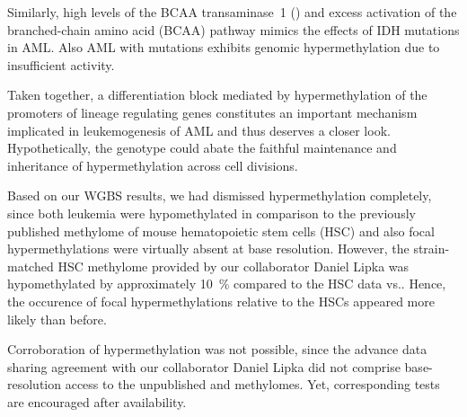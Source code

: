Similarly, high levels of the BCAA transaminase~1 () and excess activation of the branched-chain amino acid (BCAA) pathway mimics the effects of IDH mutations in AML\cite{Raffel2017}. Also AML with  mutations exhibits genomic hypermethylation due to insufficient  activity\cite{Rampal2014}.

Taken together, a differentiation block mediated by hypermethylation of the promoters of lineage regulating genes constitutes an important mechanism implicated in leukemogenesis of AML and thus deserves a closer look. Hypothetically, the \dnmtchip genotype could abate the faithful maintenance and inheritance of hypermethylation across cell divisions.  

Based on our WGBS results, we had dismissed hypermethylation completely, since both leukemia were hypomethylated in comparison to the previously published methylome of mouse hematopoietic stem cells (HSC)\cite{Jeong2014} and also focal hypermethylations were virtually absent at base resolution. However, the strain-matched \mmsvjae \dnmtwt HSC methylome provided by our collaborator Daniel Lipka was hypomethylated by approximately \SI{10}{\percent}  compared to the \mmblsix HSC data vs.. Hence, the occurence of focal hypermethylations relative to the HSCs appeared more likely than before. 

Corroboration of hypermethylation was not possible, since the advance data sharing agreement with our collaborator Daniel Lipka did not comprise base-resolution access to the unpublished \mmsvjae \dnmtwt and \dnmtchip methylomes. Yet, corresponding tests are encouraged after availability. 